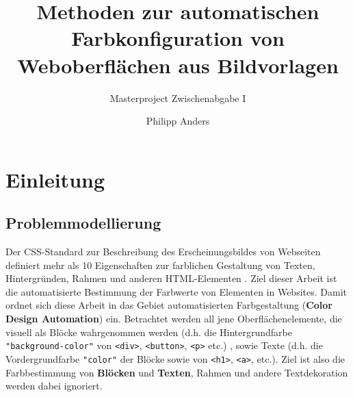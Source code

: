 \documentclass[10pt,a4paper,bibliography=totoc,twocolumn]{scrartcl}
\begin{document}
\title{Methoden zur automatischen Farbkonfiguration von Weboberflächen aus Bildvorlagen}
\subtitle{Masterproject Zwischenabgabe I}
\author{Philipp Anders}


\section{Einleitung}

\subsection{Problemmodellierung}
\label{sec:modellierung}

Der CSS-Standard zur Beschreibung des Erscheinungsbildes von Webseiten definiert mehr als 10 Eigenschaften zur farblichen Gestaltung von Texten, Hintergründen, Rahmen und anderen HTML-Elementen \citep{css3-color}. Ziel dieser Arbeit ist die automatisierte Bestimmung der Farbwerte von Elementen in Websites. Damit ordnet sich diese Arbeit in das Gebiet automatisierten Farbgestaltung (\textbf{Color Design Automation}) ein. Betrachtet werden all jene Oberflächenelemente, die visuell als Blöcke wahrgenommen werden (d.h. die Hintergrundfarbe \texttt{"background-color"} von \texttt{<div>}, \texttt{<button>}, \texttt{<p>} etc.) , sowie Texte (d.h. die Vordergrundfarbe \texttt{"color"} der Blöcke sowie von \texttt{<h1>}, \texttt{<a>}, etc.). Ziel ist also die Farbbestimmung von \textbf{Blöcken} und \textbf{Texten}, Rahmen und andere Textdekoration werden dabei ignoriert.
\end{document}
